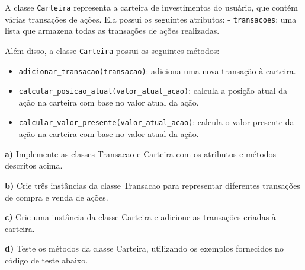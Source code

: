 \documentclass[
  portuguese,
  letterpaper,
  DIV=11,
  numbers=noendperiod]{scrreprt}
\providecommand{\tightlist}{%
  \setlength{\itemsep}{0pt}\setlength{\parskip}{0pt}}
\theoremstyle{definition}
\theoremstyle{remark}
\begin{document}
A classe \texttt{Carteira} representa a carteira de investimentos do
usuário, que contém várias transações de ações. Ela possui os seguintes
atributos: - \texttt{transacoes}: uma lista que armazena todas as
transações de ações realizadas.

Além disso, a classe \texttt{Carteira} possui os seguintes métodos:

\begin{itemize}
\tightlist
\item
  \texttt{adicionar\_transacao(transacao)}: adiciona uma nova transação
  à carteira.
\item
  \texttt{calcular\_posicao\_atual(valor\_atual\_acao)}: calcula a
  posição atual da ação na carteira com base no valor atual da ação.
\item
  \texttt{calcular\_valor\_presente(valor\_atual\_acao)}: calcula o
  valor presente da ação na carteira com base no valor atual da ação.
\end{itemize}

\textbf{a)} Implemente as classes Transacao e Carteira com os atributos
e métodos descritos acima.

\textbf{b)} Crie três instâncias da classe Transacao para representar
diferentes transações de compra e venda de ações.

\textbf{c)} Crie uma instância da classe Carteira e adicione as
transações criadas à carteira.

\textbf{d)} Teste os métodos da classe Carteira, utilizando os exemplos
fornecidos no código de teste abaixo.
\end{document}
